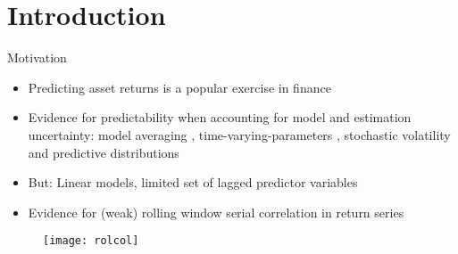 \documentclass[9pt,xcolor=x11names,compress]{beamer}
\title{\titleinfo}
\newcommand{\btext}{\textcolor{dblue}}
\let\natbibcitet\citet
\renewcommand\citet{\bibpunct{(}{)}{,}{a}{,}{,}\natbibcitet}
\let\oldcite=\cite
\renewcommand{\cite}[1]{\textcolor{dblue}{\oldcite{#1}}}
\begin{document}
\section{Introduction}
\begin{frame}[plain]
\titlepage
\end{frame}


\begin{frame}{Motivation}
	\begin{itemize}
		\item Predicting asset returns is a popular exercise in finance
		\pause
		\item Evidence for predictability when accounting for model and estimation uncertainty: model averaging \cite{pettenuzzo2016}, time-varying-parameters \cite{dangl2012}, stochastic volatility and predictive distributions \cite{Johannes2014}
		\pause
		\item But: Linear models, limited set of lagged predictor variables
		\pause
		\item Evidence for (weak) rolling window serial correlation in return series
	\end{itemize}
\vspace{-0.4cm}
\begin{figure}
\centering\label{fig:rolcol}
\texttt{[image: rolcol]}
\end{figure}
%		
%		
%		

\end{frame}
\end{document}
